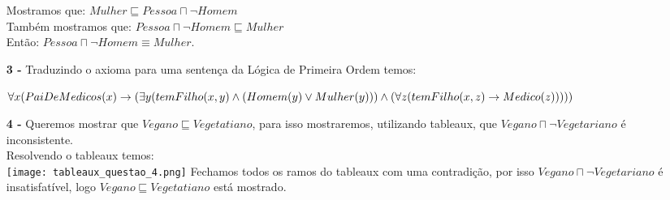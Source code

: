 \documentclass[12pt]{article}
\begin{document}
\begin{itemize}
			Mostramos que: $Mulher \sqsubseteq Pessoa \sqcap \neg Homem$\\
			Também mostramos que: $Pessoa \sqcap \neg Homem \sqsubseteq Mulher$\\
			Então: $Pessoa \sqcap \neg Homem \equiv Mulher$.
		\item[\textbf{3 -}]
			\hfill\newline
			Traduzindo o axioma para uma sentença da Lógica de Primeira Ordem temos:\\
			
			\begin{footnotesize}
			$\forall x( PaiDeMedicos(x) \rightarrow \\ (\exists y(temFilho(x, y) \wedge (Homem(y) \vee Mulher(y))) \wedge (\forall z (temFilho(x, z) \rightarrow Medico(z)))))$
			\end{footnotesize}			
		\item[\textbf{4 -}]
			\hfill\newline
			Queremos mostrar que $Vegano \sqsubseteq Vegetatiano$, para isso mostraremos,
			utilizando tableaux, que $Vegano \sqcap \neg Vegetariano$ é inconsistente.\\
			Resolvendo o tableaux temos:\\
			\texttt{[image: tableaux\_questao\_4.png]}
			Fechamos todos os ramos do tableaux com uma contradição, por isso
			$Vegano \sqcap \neg Vegetariano$ é insatisfatível, logo $Vegano \sqsubseteq Vegetatiano$ 
			está mostrado.
	\end{itemize}
\end{document}
